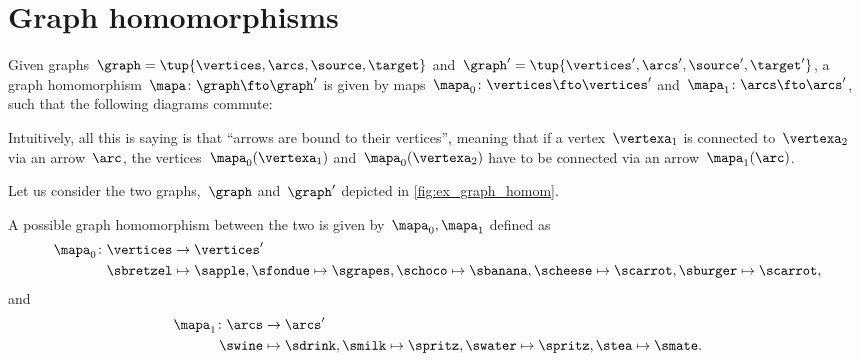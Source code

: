 
\section{Graph homomorphisms}
\begin{definition}
    \label{def:graph_homom}
    Given graphs~$\graph=\tup{\vertices,\arcs,\source,\target}$ and~$\graph'=\tup{\vertices',\arcs',\source',\target'}$, a graph homomorphism~$\mapa \colon \graph \fto \graph'$ is given by maps~$\mapa_0\colon \vertices \fto \vertices'$ and~$\mapa_1\colon \arcs \fto \arcs'$, such that the following diagrams commute:
    \begin{center}
    \end{center}
\end{definition}
\begin{remark}
    Intuitively, all this is saying is that ``arrows are bound to their vertices'', meaning that if a vertex~$\vertexa_1$ is connected to~$\vertexa_2$ via an arrow~$\arc$, the vertices~$\mapa_0(\vertexa_1)$ and~$\mapa_0(\vertexa_2)$ have to be connected via an arrow~$\mapa_1(\arc)$.
\end{remark}

\begin{example}
    \label{exa:homomorphism_graph_positive}
    Let us consider the two graphs,~$\graph$ and~$\graph'$ depicted in \cref{fig:ex_graph_homom}.
    \begin{figure*}[h]
        \centering
        \caption{Example of graphs for graph homomorphism.}
        \label{fig:ex_graph_homom}
    \end{figure*}

    A possible graph homomorphism between the two is given by~$\mapa_0,\mapa_1$ defined as
    \begin{equation*}
        \begin{aligned}
            \mapa_0\colon \vertices & \to \vertices'   \\
            \sbretzel               & \mapsto \sapple,
            \sfondue\mapsto \sgrapes,
            \schoco\mapsto \sbanana,
            \scheese\mapsto \scarrot,
            \sburger\mapsto \scarrot,
        \end{aligned}
    \end{equation*}
    and
    \begin{equation*}
        \begin{aligned}
            \mapa_1\colon \arcs & \to \arcs'       \\
            \swine              & \mapsto \sdrink,
            \smilk\mapsto \spritz,
            \swater\mapsto \spritz,
            \stea\mapsto \smate.
        \end{aligned}
    \end{equation*}
\end{example}

